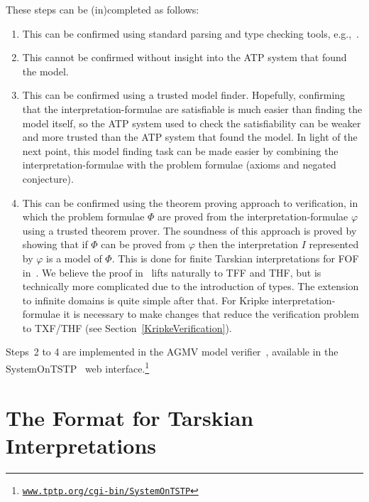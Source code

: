 \documentclass{ceurart}
\begin{document}
These steps can be (in)completed as follows:
\begin{enumerate}
\item This can be confirmed using standard parsing and type checking tools, 
      e.g.,~\cite{VS06,HR15,Ste26}.
\item This cannot be confirmed without insight into the ATP system that found the model.
\item This can be confirmed using a trusted model finder.
      Hopefully, confirming that the interpretation-formulae are satisfiable is much easier than 
      finding the model itself, so the ATP system used to check the satisfiability can be weaker 
      and more trusted than the ATP system that found the model.
      In light of the next point, this model finding task can be made easier by combining the
      interpretation-formulae with the problem formulae (axioms and negated conjecture).
\item This can be confirmed using the theorem proving approach to verification, in which the 
      problem formulae $\Phi$ are proved from the interpretation-formulae $\varphi$ using a trusted 
      theorem prover.
      The soundness of this approach is proved by showing that if $\Phi$ can be proved from 
      $\varphi$ then the interpretation $I$ represented by $\varphi$ is a model of $\Phi$.
      This is done for finite Tarskian interpretations for FOF in~\cite{SS+23-LPAR}.
      We believe the proof in~\cite{SS+23-LPAR} lifts naturally to TFF and THF, but is technically 
      more complicated due to the introduction of types.
      The extension to infinite domains is quite simple after that.
      For Kripke interpretation-formulae it is necessary to make changes that reduce the
      verification problem to TXF/THF (see Section~\ref{KripkeVerification}).
\end{enumerate}

Steps~2 to 4 are implemented in the AGMV model verifier~\cite{SS+23-LPAR}, available in the
SystemOnTSTP~\cite{Sut07-CSR} web interface.\footnote{%
\href{https://www.tptp.org/cgi-bin/SystemOnTSTP}{\tt www.tptp.org/cgi-bin/SystemOnTSTP}}
      
\section{The Format for Tarskian Interpretations}
\label{NewTarskian}
\end{document}
